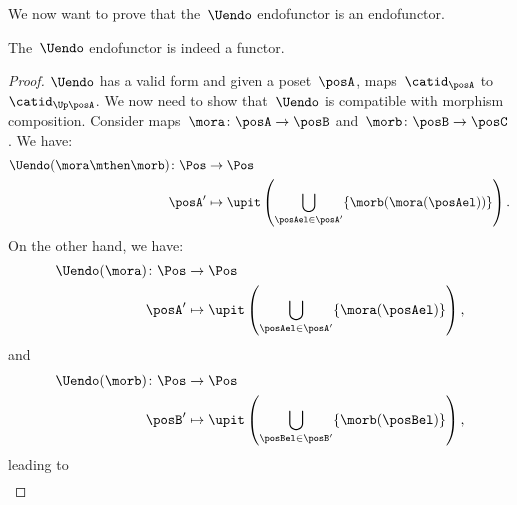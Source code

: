 We now want to prove that the~$\Uendo$ endofunctor is an endofunctor.

\begin{lemma}
	\label{lem:Uendo-is-functor}
	The~$\Uendo$ endofunctor is indeed a functor.
\end{lemma}

\begin{proof}
	$\Uendo$ has a valid form and given a poset~$\posA$, maps~$\catid_\posA$ to~$\catid_{\Up \posA}$.
	We now need to show that~$\Uendo$ is compatible with morphism composition.
	Consider maps~$\mora\colon \posA \to \posB$ and~$\morb\colon \posB \to \posC$.
	We have:
	\begin{equation}
		\label{eq:ufunctor_1}
		\begin{aligned}
			\Uendo(\mora\mthen \morb)\colon \Pos & \to \Pos                                                                           \\
			\posA'                               & \mapsto \upit \left( \bigcup_{\posAel\in \posA'} \{\morb(\mora(\posAel))\}\right).
		\end{aligned}
	\end{equation}
	On the other hand, we have:
	\begin{equation}
		\begin{aligned}
			\Uendo(\mora)\colon \Pos & \to \Pos                                                                   \\
			\posA'                   & \mapsto \upit \left( \bigcup_{\posAel\in \posA'}\{\mora(\posAel)\}\right),
		\end{aligned}
	\end{equation}
	and
	\begin{equation}
		\begin{aligned}
			\Uendo(\morb)\colon \Pos & \to \Pos                                                                   \\
			\posB'                   & \mapsto \upit \left( \bigcup_{\posBel\in \posB'}\{\morb(\posBel)\}\right),
		\end{aligned}
	\end{equation}
	leading to
	\begin{equation}
		\label{eq:ufunctor_2}
		\begin{aligned}

\end{aligned}
\end{equation}
\end{proof}
